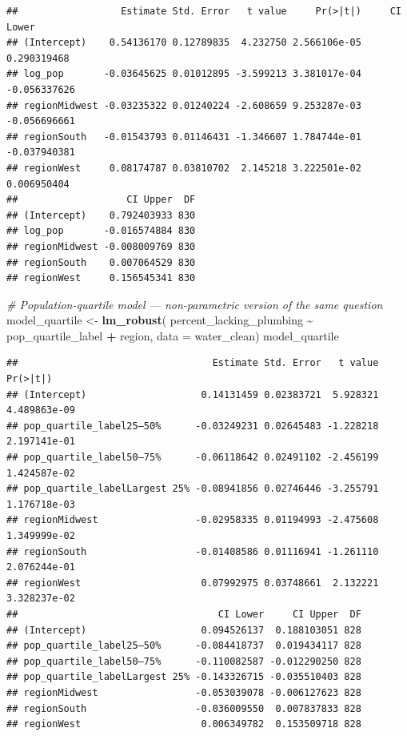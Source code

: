 \documentclass[
]{article}
\newenvironment{Shaded}{\begin{snugshade}}{\end{snugshade}}
\newcommand{\AttributeTok}[1]{\textcolor[rgb]{0.13,0.29,0.53}{#1}}
\newcommand{\CommentTok}[1]{\textcolor[rgb]{0.56,0.35,0.01}{\textit{#1}}}
\newcommand{\FunctionTok}[1]{\textcolor[rgb]{0.13,0.29,0.53}{\textbf{#1}}}
\newcommand{\NormalTok}[1]{#1}
\newcommand{\OtherTok}[1]{\textcolor[rgb]{0.56,0.35,0.01}{#1}}
\newcommand{\SpecialCharTok}[1]{\textcolor[rgb]{0.81,0.36,0.00}{\textbf{#1}}}
\begin{document}
\begin{verbatim}
##                  Estimate Std. Error   t value     Pr(>|t|)     CI Lower
## (Intercept)    0.54136170 0.12789835  4.232750 2.566106e-05  0.290319468
## log_pop       -0.03645625 0.01012895 -3.599213 3.381017e-04 -0.056337626
## regionMidwest -0.03235322 0.01240224 -2.608659 9.253287e-03 -0.056696661
## regionSouth   -0.01543793 0.01146431 -1.346607 1.784744e-01 -0.037940381
## regionWest     0.08174787 0.03810702  2.145218 3.222501e-02  0.006950404
##                   CI Upper  DF
## (Intercept)    0.792403933 830
## log_pop       -0.016574884 830
## regionMidwest -0.008009769 830
## regionSouth    0.007064529 830
## regionWest     0.156545341 830
\end{verbatim}

\begin{Shaded}
\begin{Highlighting}[]
\CommentTok{\# Population{-}quartile model — non{-}parametric version of the same question}
\NormalTok{model\_quartile }\OtherTok{\textless{}{-}} \FunctionTok{lm\_robust}\NormalTok{(}
\NormalTok{  percent\_lacking\_plumbing }\SpecialCharTok{\textasciitilde{}}\NormalTok{ pop\_quartile\_label }\SpecialCharTok{+}\NormalTok{ region,}
  \AttributeTok{data =}\NormalTok{ water\_clean)}
\NormalTok{model\_quartile}
\end{Highlighting}
\end{Shaded}

\begin{verbatim}
##                                  Estimate Std. Error   t value     Pr(>|t|)
## (Intercept)                    0.14131459 0.02383721  5.928321 4.489863e-09
## pop_quartile_label25–50%      -0.03249231 0.02645483 -1.228218 2.197141e-01
## pop_quartile_label50–75%      -0.06118642 0.02491102 -2.456199 1.424587e-02
## pop_quartile_labelLargest 25% -0.08941856 0.02746446 -3.255791 1.176718e-03
## regionMidwest                 -0.02958335 0.01194993 -2.475608 1.349999e-02
## regionSouth                   -0.01408586 0.01116941 -1.261110 2.076244e-01
## regionWest                     0.07992975 0.03748661  2.132221 3.328237e-02
##                                   CI Lower     CI Upper  DF
## (Intercept)                    0.094526137  0.188103051 828
## pop_quartile_label25–50%      -0.084418737  0.019434117 828
## pop_quartile_label50–75%      -0.110082587 -0.012290250 828
## pop_quartile_labelLargest 25% -0.143326715 -0.035510403 828
## regionMidwest                 -0.053039078 -0.006127623 828
## regionSouth                   -0.036009550  0.007837833 828
## regionWest                     0.006349782  0.153509718 828
\end{verbatim}
\end{document}
